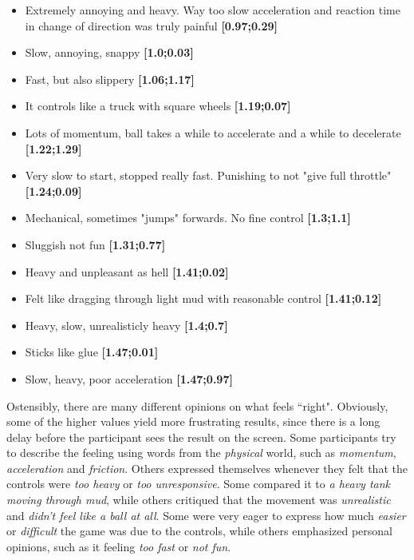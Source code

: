 \begin{itemize}[noitemsep,nolistsep]
\item Extremely annoying and heavy. Way too slow acceleration and reaction time in change of direction was truly painful \textbf{[0.97;0.29]}
\item Slow, annoying, snappy \textbf{[1.0;0.03]}
\item Fast, but also slippery \textbf{[1.06;1.17]}
\item It controls like a truck with square wheels \textbf{[1.19;0.07]}
\item Lots of momentum, ball takes a while to accelerate and a while to decelerate \textbf{[1.22;1.29]}
\item Very slow to start, stopped really fast. Punishing to not "give full throttle" \textbf{[1.24;0.09]}
\item Mechanical, sometimes "jumps" forwards. No fine control \textbf{[1.3;1.1]}
\item Sluggish not fun \textbf{[1.31;0.77]}
\item Heavy and unpleasant as hell \textbf{[1.41;0.02]}
\item Felt like dragging through light mud with reasonable control \textbf{[1.41;0.12]}
\item Heavy, slow, unrealisticly heavy \textbf{[1.4;0.7]}
\item Sticks like glue \textbf{[1.47;0.01]}
\item Slow, heavy, poor acceleration \textbf{[1.47;0.97]}
\end{itemize}

Ostensibly, there are many different opinions on what feels ``right". Obviously, some of the higher values yield more frustrating results, since there is a long delay before the participant sees the result on the screen. Some participants try to describe the feeling using words from the \textit{physical} world, such as \textit{momentum}, \textit{acceleration} and \textit{friction}. Others expressed themselves whenever they felt that the controls were \textit{too heavy} or \textit{too unresponsive}. Some compared it to \textit{a heavy tank moving through mud}, while others critiqued that the movement was \textit{unrealistic} and \textit{didn't feel like a ball at all}. Some were very eager to express how much \textit{easier} or \textit{difficult} the game was due to the controls, while others emphasized personal opinions, such as it feeling \textit{too fast} or \textit{not fun}.

